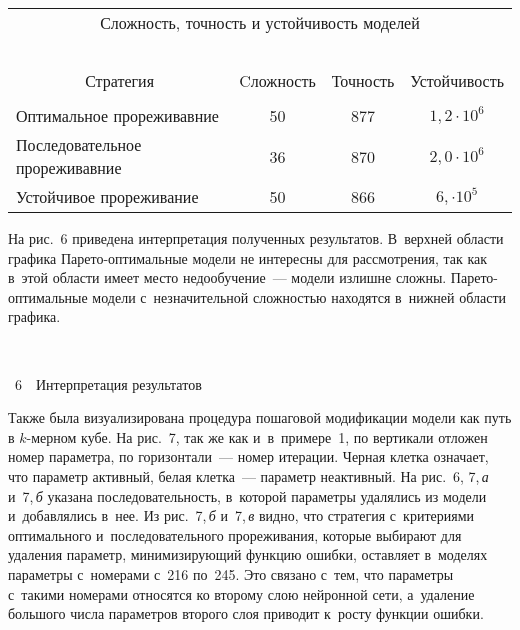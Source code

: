 \begin{multicols}{2}
\begin{table*}
\begin{center}
\begin{tabular}{|l|c|c|c|}
\multicolumn{4}{c}{Сложность, точность и устойчивость моделей}\\
\multicolumn{4}{c}{\ }\\[-5pt]
        \hline
        \multicolumn{1}{|c|}{Стратегия}& Cложность & Точность & Устойчивость \\
        \hline
&&&\\[-10pt]
        Оптимальное прореживавние & 50 & 877 & $1{,}2\cdot 10^{6}$ \\
        Последовательное прореживавние & 36 & 870 & $2{,}0 \cdot 10^{6}$ \\
        Устойчивое прореживание & 50 & 866 & $6{,}\cdot10^{5}$ \\
        \hline
\end{tabular}
\end{center}
\vspace*{-3pt}
\end{table*}


На рис.~6 приведена интерпретация полученных
результатов. В~верхней области графика Па\-ре\-то-оп\-ти\-маль\-ные модели не
интересны для рассмотрения, так как в~этой области имеет место
недо\-обуче\-ние~--- модели излишне сложны. Па\-ре\-то-опти\-маль\-ные
 модели
с~незначительной слож\-ностью находятся в~нижней области графика.

\begin{center}  %
\vspace*{1pt}
\mbox{%
 \epsfxsize=77.724mm
 }

\vspace*{3pt}


{{\figurename~6}\ \ \small{Интерпретация результатов}}
\end{center}


\vspace*{9pt}


\addtocounter{figure}{1}


Также была визуализирована процедура пошаговой модификации модели
как путь в $k$-мерном кубе. На рис.~7, так же как и~в~примере~1,
по вертикали отложен номер параметра, по горизонтали~--- номер
итерации. Черная клетка означает, что параметр активный, белая
клетка~--- параметр неактивный. На рис.~6, 7,\,\textit{а} и~7,\,\textit{б}  указана
последовательность, в~которой параметры удалялись из модели
и~до\-бав\-ля\-лись в~нее. Из рис.~7,\,\textit{б} и~7,\,\textit{в}
видно, что
стратегия с~критериями оптимального и~последовательного
прореживания, которые выбирают для удаления параметр, минимизирующий
функцию ошибки, остав\-ля\-ет в~моделях параметры с~номерами с~216 по~245.
Это связано с~тем, что параметры с~такими номерами относятся ко
второму слою нейронной сети, а~удаление большого числа параметров
второго слоя приводит к~росту функции ошибки.




\end{multicols}
